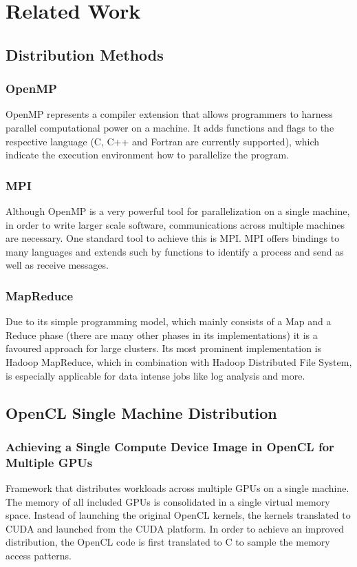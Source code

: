 
\chapter{Related Work}

\section{Distribution Methods}

\subsection{OpenMP}
OpenMP represents a compiler extension that allows programmers to harness parallel computational power on a machine. It adds functions and flags to the respective language (C, C++ and Fortran are currently supported), which indicate the execution environment how to parallelize the program.

\subsection{MPI}
Although OpenMP is a very powerful tool for parallelization on a single machine, in order to write larger scale software, communications across multiple machines are necessary. One standard tool to achieve this is MPI.
MPI offers bindings to many languages and extends such by functions to identify a process and send as well as receive messages.

\subsection{MapReduce}
Due to its simple programming model, which mainly consists of a Map and a Reduce phase (there are many other phases in its implementations) it is a favoured approach for large clusters. Its most prominent implementation is Hadoop MapReduce, which in combination with Hadoop Distributed File System, is especially applicable for data intense jobs like log analysis and more.

\section{OpenCL Single Machine Distribution}

\subsection{Achieving a Single Compute Device Image in OpenCL for Multiple GPUs\cite{Kim_2011}}
Framework that distributes workloads across multiple GPUs on a single machine. The memory of all included GPUs is consolidated in a single virtual memory space.
Instead of launching the original OpenCL kernels, the kernels translated to CUDA and launched from the CUDA platform. In order to achieve an improved distribution, the OpenCL code is first translated to C to sample the memory access patterns.

